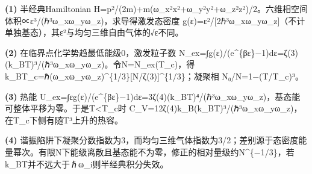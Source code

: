 \par\noindent\textbf{(1)} 半经典Hamiltonian H=p²/(2m)+m(ω\_x²x²+ω\_y²y²+ω\_z²z²)/2。六维相空间体积∝ε³/(ℏ³ω\_xω\_yω\_z)，求导得激发态密度 g(ε)=ε²/[2ℏ³ω\_xω\_yω\_z]（不计单独基态），其ε²与均匀三维自由气体的√ε不同。
\par\noindent\textbf{(2)} 在临界点化学势趋最低能级0，激发粒子数 N\_ex=∫g(ε)/(e\textasciicircum{}\{βε\}−1)dε=ζ(3)(k\_BT)³/(ℏ³ω\_xω\_yω\_z)。令N=N\_ex(T\_c)，得 k\_BT\_c=ℏ(ω\_xω\_yω\_z)\textasciicircum{}\{1/3\}[N/ζ(3)]\textasciicircum{}\{1/3\}；凝聚相 N₀/N=1−(T/T\_c)³。
\par\noindent\textbf{(3)} 热能 U\_ex=∫εg(ε)/(e\textasciicircum{}\{βε\}−1)dε=3ζ(4)(k\_BT)⁴/(ℏ³ω\_xω\_yω\_z)，基态能可整体平移为零。于是T<T\_c时 C\_V=12ζ(4)k\_B(k\_BT)³/(ℏ³ω\_xω\_yω\_z)，在T\_c下侧有随T³上升的热容。
\par\noindent\textbf{(4)} 谐振陷阱下凝聚分数指数为3，而均匀三维气体指数为3/2；差别源于态密度能量幂次。有限N下能级离散且基态能不为零，修正的相对量级约N\textasciicircum{}\{−1/3\}，若k\_BT并不远大于ℏω\_i则半经典积分失效。
